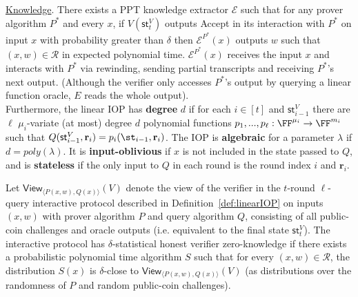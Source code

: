 \begin{definition} 
\noindent \underline{Knowledge}. There exists a PPT knowledge extractor $\mathcal{E}$ such that for any prover algorithm $P^*$ and every $x$, if $V(\textsf{st}^V_t)$ outputs \textsf{Accept} in its interaction with $P^*$ on input $x$ with probability greater than $\delta$ then $\mathcal{E}^{P^*}(x)$ outputs $w$ such that $(x, w) \in \mathcal{R}$ in expected polynomial time. $\mathcal{E}^{P^*}(x)$ receives the input $x$ and interacts with $P^*$ via rewinding, sending partial transcripts and receiving $P^*$'s next output. (Although the verifier only accesses $P^*$'s output by querying a linear function oracle, $E$ reads the whole output).  \\

Furthermore, the linear IOP has \textbf{degree} $d$ if for each $i \in [t]$ and $\textsf{st}^V_{i-1}$ there are $\ell$ $\mu_i$-variate (at most) degree $d$ polynomial functions $p_1,...,p_\ell: \FF^{\mu_i} \rightarrow \FF^{m_i}$ such that $Q(\textsf{st}^V_{i-1}, \mathbf{r}_i) = p_i(\st_{i-1}, \mathbf{r}_i)$. The IOP is \textbf{algebraic} for a parameter $\lambda$ if $d = poly(\lambda)$.
It is \textbf{input-oblivious} if $x$ is not included in the state passed to $Q$, and is \textbf{stateless} if the only input to $Q$ in each round is the round index $i$ and $\mathbf{r}_i$.


\end{definition} 


\begin{definition}
Let $\textsf{View}_{\langle P(x, w), Q(x) \rangle}(V)$ denote the view of the verifier in the $t$-round $\ell$-query interactive protocol described in Definition~\ref{def:linearIOP} on inputs $(x,w)$ with prover algorithm $P$ and query algorithm $Q$, consisting of all public-coin challenges and oracle outputs (i.e. equivalent to the final state $\textsf{st}^V_t$). The interactive protocol has $\delta$-statistical honest verifier zero-knowledge if there exists a probabilistic polynomial time algorithm $S$ such that for every $(x, w) \in \mathcal{R}$, the distribution $S(x)$ is $\delta$-close to $\textsf{View}_{\langle P(x, w), Q(x) \rangle}(V)$ (as distributions over the randomness of $P$ and random public-coin challenges).
\end{definition}

